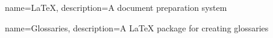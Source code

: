 {
	name=LaTeX,
	description={A document preparation system}
}

{
	name=Glossaries,
	description={A LaTeX package for creating glossaries}
}

